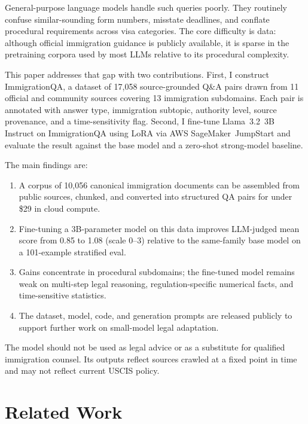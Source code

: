 \documentclass[11pt]{article}
\begin{document}
General-purpose language models handle such queries poorly. They routinely confuse similar-sounding form numbers, misstate deadlines, and conflate procedural requirements across visa categories. The core difficulty is data: although official immigration guidance is publicly available, it is sparse in the pretraining corpora used by most LLMs relative to its procedural complexity.

This paper addresses that gap with two contributions. First, I construct ImmigrationQA, a dataset of 17,058 source-grounded Q\&A pairs drawn from 11 official and community sources covering 13 immigration subdomains. Each pair is annotated with answer type, immigration subtopic, authority level, source provenance, and a time-sensitivity flag. Second, I fine-tune Llama~3.2~3B Instruct on ImmigrationQA using LoRA via AWS SageMaker~JumpStart and evaluate the result against the base model and a zero-shot strong-model baseline.

The main findings are:
\begin{enumerate}[nosep]
  \item A corpus of 10,056 canonical immigration documents can be assembled from public sources, chunked, and converted into structured QA pairs for under \$29 in cloud compute.
  \item Fine-tuning a 3B-parameter model on this data improves LLM-judged mean score from 0.85 to 1.08 (scale 0--3) relative to the same-family base model on a 101-example stratified eval.
  \item Gains concentrate in procedural subdomains; the fine-tuned model remains weak on multi-step legal reasoning, regulation-specific numerical facts, and time-sensitive statistics.
  \item The dataset, model, code, and generation prompts are released publicly to support further work on small-model legal adaptation.
\end{enumerate}

The model should not be used as legal advice or as a substitute for qualified immigration counsel. Its outputs reflect sources crawled at a fixed point in time and may not reflect current USCIS policy.

\section{Related Work}
\label{sec:related_work}
\end{document}
